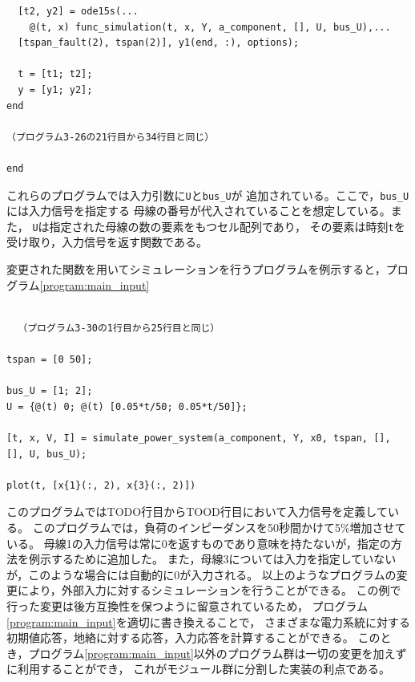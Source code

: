 \documentclass[tombow,dvipdfmx]{corona-a5-1.1}
\begin{document}
\begin{例}
\begin{PROGRAMA}[count,title={simulate\_power\_system.m}]
\begin{verbatim}
  [t2, y2] = ode15s(...
    @(t, x) func_simulation(t, x, Y, a_component, [], U, bus_U),...
  [tspan_fault(2), tspan(2)], y1(end, :), options);

  t = [t1; t2];
  y = [y1; y2];
end

（プログラム3-26の21行目から34行目と同じ）

end
\end{verbatim}
\end{PROGRAMA}

これらのプログラムでは入力引数に\verb|U|と\verb|bus_U|が
追加されている。ここで，\verb|bus_U|には入力信号を指定する
母線の番号が代入されていることを想定している。また，
\verb|U|は指定された母線の数の要素をもつセル配列であり，
その要素は時刻\verb|t|を受け取り，入力信号を返す関数である。

変更された関数を用いてシミュレーションを行うプログラムを例示すると，プログラム\nobreak\ref{program:main_input}

\begin{PROGRAMA}[count,title={main\_simulation\_3bus\_input.m}]\label{program:main_input}
\begin{verbatim}

  （プログラム3-30の1行目から25行目と同じ）

tspan = [0 50];

bus_U = [1; 2];
U = {@(t) 0; @(t) [0.05*t/50; 0.05*t/50]};

[t, x, V, I] = simulate_power_system(a_component, Y, x0, tspan, [], [], U, bus_U);

plot(t, [x{1}(:, 2), x{3}(:, 2)])
  \end{verbatim}
\end{PROGRAMA}
このプログラムではTODO行目からTOOD行目において入力信号を定義している。
このプログラムでは，負荷のインピーダンスを50秒間かけて5\%増加させている。
母線1の入力信号は常に0を返すものであり意味を持たないが，指定の方法を例示するために追加した。
また，母線3については入力を指定していないが，このような場合には自動的に0が入力される。
以上のようなプログラムの変更により，外部入力に対するシミュレーションを行うことができる。
この例で行った変更は後方互換性を保つように留意されているため，
プログラム\nobreak\ref{program:main_input}を適切に書き換えることで，
さまざまな電力系統に対する初期値応答，地絡に対する応答，入力応答を計算することができる。
このとき，プログラム\nobreak\ref{program:main_input}以外のプログラム群は一切の変更を加えずに利用することができ，
これがモジュール群に分割した実装の利点である。
\end{例}
\newpage
\end{document}
